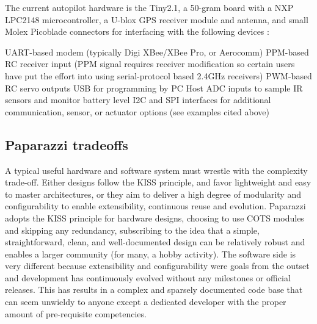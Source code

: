 \documentclass[a4paper,11pt]{report}
\begin{document}
The current autopilot hardware is the Tiny2.1, a 50-gram board with a NXP LPC2148 microcontroller, a U-blox GPS receiver module and antenna, and small Molex Picoblade connectors for interfacing with the following devices :

UART-based modem (typically Digi XBee/XBee Pro, or Aerocomm)
PPM-based RC receiver input (PPM signal requires receiver modification so certain users have put the effort into using serial-protocol based 2.4GHz receivers)
PWM-based RC servo outputs
USB for programming by PC Host
ADC inputs to sample IR sensors and monitor battery level
I2C and SPI interfaces for additional communication, sensor, or actuator options (see examples cited above)

\subsection{Paparazzi tradeoffs}

A typical useful hardware and software system must wrestle with the complexity trade-off. Either designs follow the KISS principle, and favor lightweight and easy to master architectures, or they aim to deliver a high degree of modularity and configurability to enable extensibility, continuous reuse and evolution. Paparazzi adopts the KISS principle for hardware designs, choosing to use COTS modules and skipping any redundancy, subscribing to the idea that a simple, straightforward, clean, and well-documented design can be relatively robust and enables a larger community (for many, a hobby activity). The software side is very different because extensibility and configurability were goals from the outset and development has continuously evolved without any milestones or official releases. This has results in a complex and sparsely documented code base that can seem unwieldy to anyone except a dedicated developer with the proper amount of pre-requisite competencies.
\end{document}
